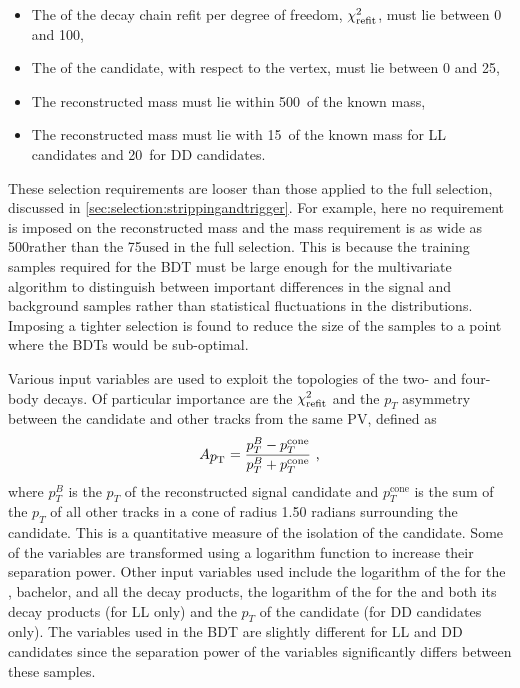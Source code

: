 \begin{itemize}
\item The \chisq of the decay chain refit per degree of freedom, $\chi^2_\text{refit}$, must lie between 0 and 100,
\item The \chisqip of the \Bm candidate, with respect to the \Bm vertex, must lie between 0 and 25,
\item The reconstructed \Kstarm mass must lie within 500~\mevcc of the known \Kstarm mass,
\item The reconstructed \KS mass must lie with 15~\mevcc of the known \KS mass for LL candidates and 20~\mevcc for DD candidates.
\end{itemize}
These selection requirements are looser than those applied to the full selection, discussed in \sect\ref{sec:selection:strippingandtrigger}. For example, here no requirement is imposed on the reconstructed \Dz mass and the \Kstarm mass requirement is as wide as 500\mevcc rather than the 75\mevcc used in the full selection. This is because the training samples required for the BDT must be large enough for the multivariate algorithm to distinguish between important differences in the signal and background samples rather than statistical fluctuations in the distributions. Imposing a tighter selection is found to reduce the size of the samples to a point where the BDTs would be sub-optimal.

Various input variables are used to exploit the topologies of the two- and four-body decays. Of particular importance are the $\chi^2_\text{refit}$ and the $p_T$ asymmetry between the \Bm candidate and other tracks from the same PV, defined as
\begin{equation}
A_{\mbox{$p_{\mathrm{ T}}$}} = \frac{p_T^B - p_T^{\text{cone}}}{p_T^B + p_T^{\text{cone}}} \text{ ,}
\label{ptasy}
\end{equation}
where $p_T^B$ is the $p_T$ of the reconstructed \Bm signal candidate and $p_T^{\text{cone}}$ is the sum of the $p_T$ of all other tracks in a cone of radius 1.50 radians surrounding the \Bm candidate. This is a quantitative measure of the isolation of the \Bm candidate. Some of the variables are transformed using a logarithm function to increase their separation power. Other input variables used include the logarithm of the \chisqip for the \Bm, bachelor, \Dz and all the \Dz decay products, the logarithm of the \chisqip for the \KS and both its decay products (for LL only) and the $p_T$ of the \KS candidate (for DD candidates only). The variables used in the BDT are slightly different for LL and DD candidates since the separation power of the \KS variables significantly differs between these samples. 

